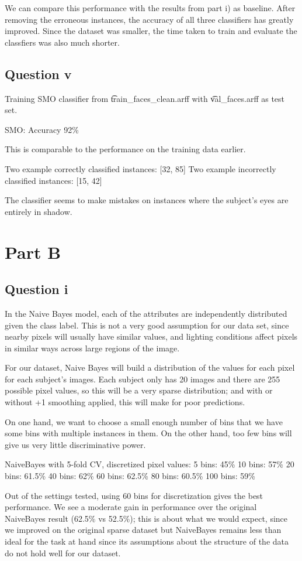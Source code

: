 \documentclass[a4paper]{article}
\begin{document}
We can compare this performance with the results from part i) as baseline. After removing the erroneous instances, the accuracy of all three classifiers has greatly improved. Since the dataset was smaller, the time taken to train and evaluate the classfiers was also much shorter.

\subsection*{Question v}
Training SMO classifier from \t{train_faces_clean.arff} with \t{val_faces.arff} as test set.

SMO: Accuracy 92\%

This is comparable to the performance on the training data earlier.

Two example correctly classified instances: [32, 85]
Two example incorrectly classified instances: [15, 42]

The classifier seems to make mistakes on instances where the subject's eyes are entirely in shadow.

\section*{Part B}
\subsection*{Question i}
In the Naive Bayes model, each of the attributes are independently distributed given the class label. This is not a very good assumption for our data set, since nearby pixels will usually have similar values, and lighting conditions affect pixels in similar ways across large regions of the image.

For our dataset, Naive Bayes will build a distribution of the values for each pixel for each subject's images. Each subject only has 20 images and there are 255 possible pixel values, so this will be a very sparse distribution; and with or without +1 smoothing applied, this will make for poor predictions.

On one hand, we want to choose a small enough number of bins that we have some bins with multiple instances in them. On the other hand, too few bins will give us very little discriminative power. 

NaiveBayes with 5-fold CV, discretized pixel values:
5 bins:  45\%
10 bins: 57\%
20 bins: 61.5\%
40 bins: 62\%
60 bins: 62.5\%
80 bins: 60.5\%
100 bins: 59\%

Out of the settings tested, using 60 bins for discretization gives the best performance. We see a moderate gain in performance over the original NaiveBayes result (62.5\% vs 52.5\%); this is about what we would expect, since we improved on the original sparse dataset but NaiveBayes remains less than ideal for the task at hand since its assumptions about the structure of the data do not hold well for our dataset.
\end{document}
